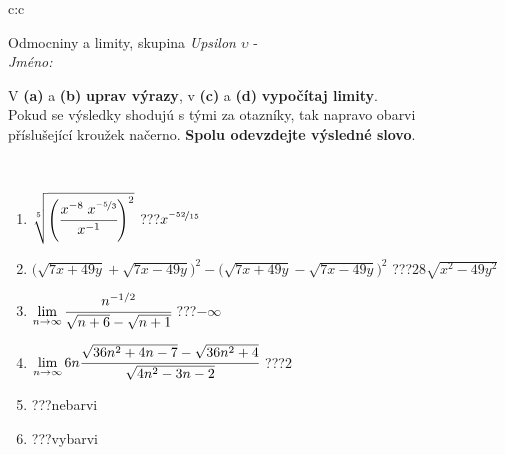 \documentclass[10pt]{report}
\begin{document}
\newpage
\thispagestyle{empty}
\begin{tabular}{c:c}
\begin{minipage}[c][104.5mm][t]{0.5\linewidth}
\begin{center}
\vspace{7mm}
{\huge Odmocniny a limity, skupina \textit{Upsilon $\upsilon$} -}\\[5mm]
\textit{Jméno:}\phantom{xxxxxxxxxxxxxxxxxxxxxxxxxxxxxxxxxxxxxxxxxxxxxxxxxxxxxxxxxxxxxxxxx}\\[5mm]
\begin{minipage}{0.95\linewidth}
\begin{center}
V \textbf{(a)} a \textbf{(b)} \textbf{uprav výrazy}, v \textbf{(c)} a \textbf{(d)} \textbf{vypočítaj limity}.\\Pokud se výsledky shodujú s tými za otazníky, tak napravo obarvi\\příslušející kroužek načerno. \textbf{Spolu odevzdejte výsledné slovo}.
\end{center}
\end{minipage}
\\[1mm]
\begin{minipage}{0.79\linewidth}
\begin{center}
\begin{varwidth}{\linewidth}
\begin{enumerate}
\small
\item $\sqrt[5]{\left(\cfrac{x^{-8}\;x^{\nicefrac{-5}{3}}}{x^{-1}}\right)^{2}}$\quad \dotfill\; ???\;\dotfill \quad $x^{\nicefrac{-52}{15}}$
\item {\footnotesize{\scriptsize$\big(\sqrt{7x+49y}+\sqrt{7x-49y}\big)^2-\big(\sqrt{7x+49y}-\sqrt{7x-49y}\big)^2$}\quad \dotfill\; ???\;\dotfill \quad $28\sqrt{x^2-49y^2}$}
\item $\lim\limits_{n\to\infty}\cfrac{n^{-1/2}}{\sqrt{n+6}-\sqrt{n+1}}$\quad \dotfill\; ???\;\dotfill \quad $-\infty$
\item $\lim\limits_{n\to\infty}6n\cfrac{\sqrt{36n^2+4n-7}-\sqrt{36n^2+4}}{\sqrt{4n^2-3n-2}}$\quad \dotfill\; ???\;\dotfill \quad $2$
\item \quad \dotfill\; ???\;\dotfill \quad nebarvi
\item \quad \dotfill\; ???\;\dotfill \quad vybarvi
\end{enumerate}
\end{varwidth}
\end{center}
\end{minipage}
\begin{minipage}{0.20\linewidth}

\end{minipage}
\end{center}
\end{minipage}
\end{tabular}
\end{document}
